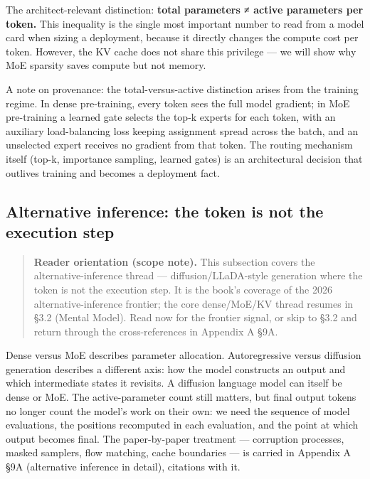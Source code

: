 The architect-relevant distinction: \textbf{total parameters ≠ active
parameters per token.} This inequality is the single most important
number to read from a model card when sizing a deployment, because it
directly changes the compute cost per token. However, the KV cache does
not share this privilege --- we will show why MoE sparsity saves compute
but not memory.

A note on provenance: the total-versus-active distinction arises from
the training regime. In dense pre-training, every token sees the full
model gradient; in MoE pre-training a learned gate selects the top-k
experts for each token, with an auxiliary load-balancing loss keeping
assignment spread across the batch, and an unselected expert receives no
gradient from that token. The routing mechanism itself (top-k,
importance sampling, learned gates) is an architectural decision that
outlives training and becomes a deployment fact.

\subsection{Alternative inference: the token is not the execution
step}\label{alternative-inference-the-token-is-not-the-execution-step}

\begin{quote}
\textbf{Reader orientation (scope note).} This subsection covers the
alternative-inference thread --- diffusion/LLaDA-style generation where
the token is not the execution step. It is the book's coverage of the
2026 alternative-inference frontier; the core dense/MoE/KV thread
resumes in §3.2 (Mental Model). Read now for the frontier signal, or
skip to §3.2 and return through the cross-references in Appendix A §9A.
\end{quote}

Dense versus MoE describes parameter allocation. Autoregressive versus
diffusion generation describes a different axis: how the model
constructs an output and which intermediate states it revisits. A
diffusion language model can itself be dense or MoE. The
active-parameter count still matters, but final output tokens no longer
count the model's work on their own: we need the sequence of model
evaluations, the positions recomputed in each evaluation, and the point
at which output becomes final. The paper-by-paper treatment ---
corruption processes, masked samplers, flow matching, cache boundaries
--- is carried in Appendix A §9A (alternative inference in detail),
citations with it.

